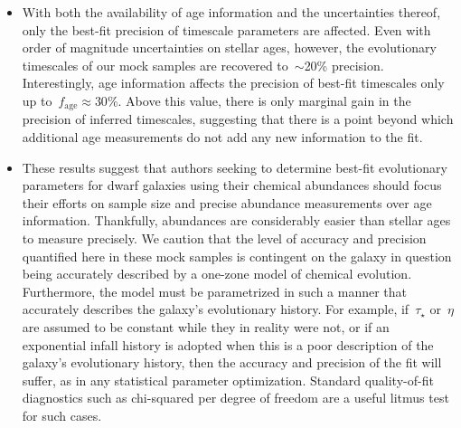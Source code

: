 \documentclass[ms.tex]{subfiles}
\begin{document}
\begin{itemize}
	\item With both the availability of age information and the uncertainties
	thereof, only the best-fit precision of timescale parameters are affected.
	Even with order of magnitude uncertainties on stellar ages, however, the
	evolutionary timescales of our mock samples are recovered to~$\sim$20\%
	precision.
	Interestingly, age information affects the precision of best-fit timescales
	only up to~$f_\text{age} \approx 30\%$.
	Above this value, there is only marginal gain in the precision of inferred
	timescales, suggesting that there is a point beyond which additional age
	measurements do not add any new information to the fit.

	\item These results suggest that authors seeking to determine best-fit
	evolutionary parameters for dwarf galaxies using their chemical abundances
	should focus their efforts on sample size and precise abundance
	measurements over age information.
	Thankfully, abundances are considerably easier than stellar ages to measure
	precisely.
	We caution that the level of accuracy and precision quantified here in
	these mock samples is contingent on the galaxy in question being accurately
	described by a one-zone model of chemical evolution.
	Furthermore, the model must be parametrized in such a manner that
	accurately describes the galaxy's evolutionary history.
	For example, if~$\tau_\star$ or~$\eta$ are assumed to be constant while
	they in reality were not, or if an exponential infall history is adopted
	when this is a poor description of the galaxy's evolutionary history, then
	the accuracy and precision of the fit will suffer, as in any statistical
	parameter optimization.
	Standard quality-of-fit diagnostics such as chi-squared per degree of
	freedom are a useful litmus test for such cases.

\end{itemize}
\end{document}

